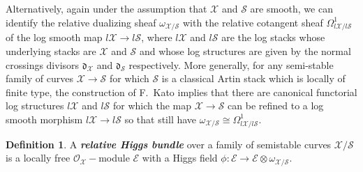 \documentclass[11pt]{amsart}
\theoremstyle{plain}
\numberwithin{equation}{section}
\theoremstyle{definition}
\newtheorem{Def}{Definition}[section]
\newtheorem{Rem}[Def]{Remark}
\theoremstyle{plain}
\begin{document}
Alternatively, again under the assumption that   $\mathcal{X}$ and $\mathcal{S}$ are smooth,  we can identify  the relative dualizing sheaf $\omega_{\mathcal{X}/\mathcal{S}}$ with  the  relative  cotangent sheaf $\Omega^{1}_{l\mathcal{X}/l\mathcal{S}}$ of the log smooth map $l\mathcal{X} \to l\mathcal{S}$, where $l\mathcal{X}$ and $l\mathcal{S}$ are the log stacks whose underlying stacks are  $\mathcal{X}$ and $\mathcal{S}$ and whose log structures are given by the normal crossings divisors $\boldsymbol{\mathfrak{d}}_{\mathcal{X}}$ and $\boldsymbol{\mathfrak{d}}_{\mathcal{S}}$ respectively. More generally, for any semi-stable family of curves  $\mathcal{X} \to \mathcal{S}$ for which $\mathcal{S}$ is a classical Artin stack which is locally of finite type, the construction of F.~Kato \cite{17} implies that there are canonical functorial log structures $l\mathcal{X}$ and $l\mathcal{S}$ for which the map $\mathcal{X} \to \mathcal{S}$ can be refined to a log smooth morphism $l\mathcal{X} \to l\mathcal{S}$ so that still have $\omega_{\mathcal{X}/\mathcal{S}} \cong \Omega^{1}_{l\mathcal{X}/l\mathcal{S}}$.


\smallskip

\smallskip

\begin{Def} \label{def-relative}
A \emph{\bfseries relative Higgs bundle} over a family of semistable curves $\mathcal X/\mathcal S$ is a locally free $\mathcal O_{\mathcal X}-$module $\mathcal E$ with a Higgs field \linebreak $\phi: \mathcal E\longrightarrow \mathcal E\otimes \omega_{\mathcal X/\mathcal S}$.
\end{Def}
\end{document}
